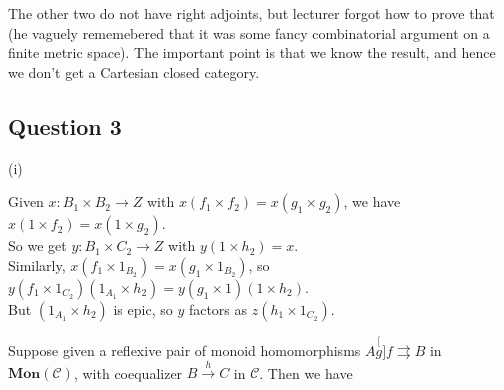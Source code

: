 \documentclass[a4paper]{article}
\begin{document}
The other two do not have right adjoints, but lecturer forgot how to prove that (he vaguely rememebered that it was some fancy combinatorial argument on a finite metric space). The important point is that we know the result, and hence we don't get a Cartesian closed category.

\subsection{Question 3}
(i)


Given $x:B_1 \times B_2 \to Z$ with $x(f_1 \times f_2) = x(g_1 \times g_2)$, we have $x(1 \times f_2) = x(1 \times g_2)$.\\
So we get $y:B_1 \times C_2 \to Z$ with $y(1 \times h_2) = x$.\\
Similarly, $x(f_1\times 1_{B_2}) = x(g_1 \times 1_{B_2})$, so $y(f_1 \times 1_{C_2})(1_{A_1} \times h_2) = y(g_1 \times 1)(1 \times h_2)$.\\
But $(1_{A_1} \times h_2)$ is epic, so $y$ factors as $z(h_1 \times 1_{C_2})$.

Suppose given a reflexive pair of monoid homomorphisms $A \stackrel[g]{f}{\rightrightarrows} B$ in $\mathbf{Mon}(\mathcal{C})$, with coequalizer $B \xrightarrow{h} C$ in $\mathcal{C}$. Then we have 

\end{document}
